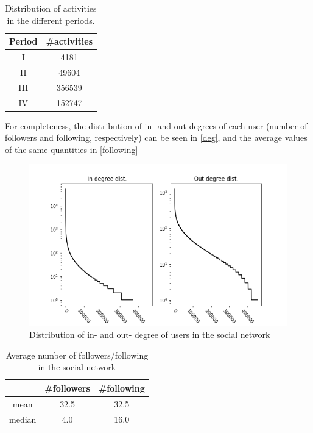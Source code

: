 \documentclass[sigconf]{acmart}
\begin{document}
\begin{table}[htp]
\caption{Distribution of activities in the different periods.}
\begin{center}
\begin{tabular}{|c|c|}
\hline
 Period & \#activities \\
\hline
 I      & 4181  \\
 II    & 49604   \\    
 III   & 356539   \\   
 IV &   152747 \\
 \hline
\end{tabular}
\end{center}
\label{activityperiod}
\end{table}

For completeness, the distribution of in- and out-degrees of each user (number of followers and following, respectively) can be seen in \autoref{deg}, and the average values of the same quantities in \autoref{following}

\begin{figure}[htbp]
\begin{center}
\includegraphics[width=\linewidth]{Figures/deg.png}
\caption{Distribution of in- and out- degree of users in the social network}
\label{deg}
\end{center}
\end{figure}

\begin{table}[htp]
\caption{Average number of followers/following in the social network}
\begin{center}
\begin{tabular}{|c|c|c|}
\hline
 & \#followers & \#following \\
 \hline
mean &32.5 & 32.5 \\
median & 4.0 & 16.0 \\
\hline
\end{tabular}
\end{center}
\label{following}
\end{table}
\end{document}
